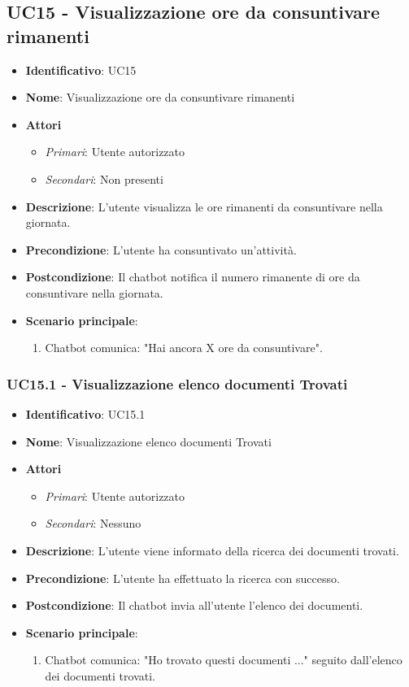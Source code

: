 \subsection{UC15 - Visualizzazione ore da consuntivare rimanenti }
\begin{itemize}
	\item \textbf{Identificativo}: UC15
	\item \textbf{Nome}: Visualizzazione ore da consuntivare rimanenti
	\item \textbf{Attori}
	\begin{itemize} 
		\item \textit{Primari}: Utente autorizzato
		\item \textit{Secondari}: Non presenti
	\end{itemize}
	\item \textbf{Descrizione}: L'utente visualizza le ore rimanenti da consuntivare nella giornata.
	\item \textbf{Precondizione}: L'utente ha consuntivato un'attività.
	\item \textbf{Postcondizione}: Il chatbot notifica il numero rimanente di ore da consuntivare nella giornata.
	\item \textbf{Scenario principale}: \begin{enumerate}
		\item Chatbot comunica: "Hai ancora X ore da consuntivare".
	\end{enumerate}
\end{itemize}
\subsubsection{UC15.1 - Visualizzazione elenco documenti Trovati}
\begin{itemize}
	\item \textbf{Identificativo}: UC15.1
	\item \textbf{Nome}: Visualizzazione elenco documenti Trovati
	\item \textbf{Attori}
	\begin{itemize} 
		\item \textit{Primari}: Utente autorizzato
		\item \textit{Secondari}: Nessuno
	\end{itemize}
	\item \textbf{Descrizione}: L'utente viene informato della ricerca dei documenti trovati.
	\item \textbf{Precondizione}: L'utente ha effettuato la ricerca con successo.
	\item \textbf{Postcondizione}: Il chatbot invia all'utente l'elenco dei documenti.
	\item \textbf{Scenario principale}: \begin{enumerate}
		\item Chatbot comunica: "Ho trovato questi documenti ..." seguito dall'elenco dei documenti trovati.
	\end{enumerate}
\end{itemize}